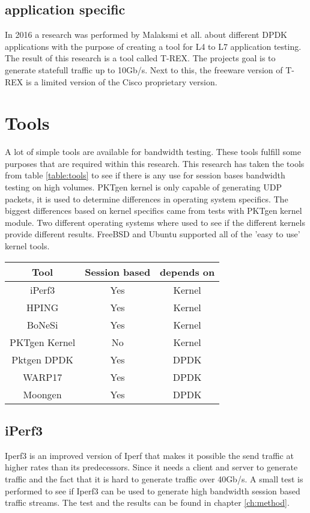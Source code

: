 \subsection{application specific}
In 2016 a research was performed by Malaksmi et all. \cite{mahalakshmi2016study} about different DPDK applications with the purpose of creating a tool for L4 to L7 application testing. 
The result of this research is a tool called T-REX. The projects goal is to generate statefull traffic up to 10Gb/s. Next to this, the freeware version of T-REX is a limited version of the Cisco proprietary version.

\section{Tools}\label{sec:tools}
A lot of simple tools are available for bandwidth testing. These tools fulfill some purposes that are required within this research.
This research has taken the tools from table \ref{table:tools} to see if there is any use for session bases bandwidth testing on high volumes.
PKTgen kernel is only capable of generating UDP packets, it is used to determine differences in operating system specifics. The biggest differences based on kernel specifics came from tests with PKTgen kernel module.
Two different operating systems where used to see if the different kernels provide different results. FreeBSD and Ubuntu supported all of the 'easy to use' kernel tools.

\begin{table*}[ht]
\centering
\begin{tabular}{|c|c|c|} \hline
\textbf{Tool} & \textbf{Session based} & \textbf{depends on} \\ \hline
iPerf3\cite{iperf} & Yes & Kernel  \\ \hline
HPING\cite{hping}  & Yes & Kernel \\ \hline
BoNeSi\cite{bonesi} & Yes & Kernel \\ \hline
PKTgen Kernel\cite{pktgen-kernel} & No & Kernel \\ \hline
Pktgen DPDK\cite{pktgen-dpdk} & Yes & DPDK \\ \hline
WARP17\cite{warp} & Yes & DPDK \\ \hline
Moongen\cite{moongen} & Yes & DPDK \\ \hline
\end{tabular}
\caption{available tools}
\label{table:tools}
\end{table*} 

\subsection{iPerf3}\label{sub:iperf3}
Iperf3 is an improved version of Iperf that makes it possible the send traffic at higher rates than its predecessors. Since it needs a client and server to generate traffic and the fact that it is hard to generate traffic over 40Gb/s. A small test is performed to see if Iperf3 can be used to generate high bandwidth session based traffic streams. The test and the results can be found in chapter \ref{ch:method}.

